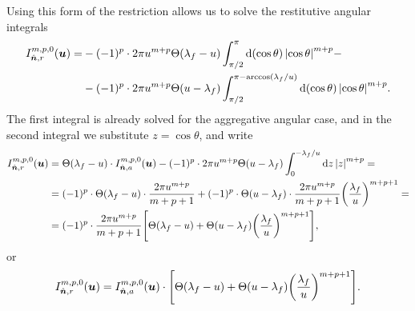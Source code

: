 \documentclass[aps,prl,preprint,groupedaddress,10pt]{revtex4-2}
\begin{document}
Using this form of the restriction allows us to solve the restitutive angular integrals
\begin{equation}
    \begin{split}
        I_{\bn,r}^{m,p,0}(\bu)=&-(-1)^p\cdot 2\pi u^{m+p}\Theta\pqty{\lambda_f-u}
        \int_{\pi/2}^{\pi}\dd{\pqty{\cos\theta}}\abs{\cos\theta}^{m+p}-\\
        &-(-1)^p\cdot 2\pi u^{m+p}\Theta\pqty{u-\lambda_f}
        \int_{\pi/2}^{\pi-\arccos(\lambda_f/u)}\dd{\pqty{\cos\theta}}\abs{\cos\theta}^{m+p}.
    \end{split}
\end{equation}
The first integral is already solved for the aggregative angular case, and in the
second integral we substitute $z=\cos\theta$, and write
\begin{equation}
    \begin{split}
        I_{\bn,r}^{m,p,0}(\bu)&=\Theta\pqty{\lambda_f-u}\cdot I_{\bn,a}^{m,p,0}(\bu)-
        (-1)^p\cdot 2\pi u^{m+p}\Theta\pqty{u-\lambda_f}
        \int_{0}^{-\lambda_f/u}\dd{z}\abs{z}^{m+p}=\\
        &=(-1)^p\cdot\Theta\pqty{\lambda_f-u}\cdot
        \frac{2\pi u^{m+p}}{m+p+1}+
        (-1)^p\cdot \Theta\pqty{u-\lambda_f}\cdot\frac{2\pi u^{m+p}}{m+p+1}
        \pqty{\frac{\lambda_f}{u}}^{m+p+1}=\\
        &=(-1)^p\cdot\frac{2\pi u^{m+p}}{m+p+1}
        \bqty{\Theta\pqty{\lambda_f-u}+\Theta\pqty{u-\lambda_f}
            \pqty{\frac{\lambda_f}{u}}^{m+p+1}},
    \end{split}
\end{equation}
or
\begin{equation}
    I_{\bn,r}^{m,p,0}(\bu)=I_{\bn,a}^{m,p,0}(\bu)\cdot
    \bqty{\Theta\pqty{\lambda_f-u}+\Theta\pqty{u-\lambda_f}\pqty{\frac{\lambda_f}{u}}^{m+p+1}}.
\end{equation}
\end{document}
